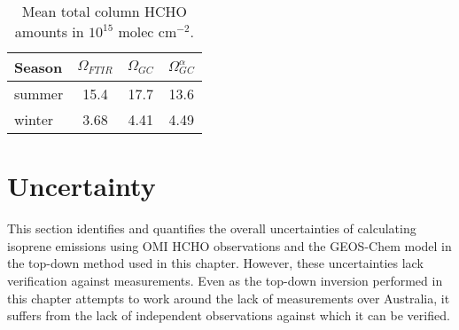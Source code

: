   
    \begin{table}\begin{threeparttable}
      \caption{Mean total column HCHO amounts in $10^{15}$ molec cm$^{-2}$.}
      \begin{tabular}{ l | c c c } 
        \toprule
        Season & $\Omega_{FTIR}$ & $\Omega_{GC}$ &  $\Omega_{GC}^{\alpha}$  \\
        \midrule
        summer & 15.4 & 17.7 & 13.6 \\
        winter & 3.68 & 4.41 & 4.49 \\
        \bottomrule
      \end{tabular}
      \label{BioIsop:results:measurements:tab_uncertainties}
    \end{threeparttable}\end{table}
  
  
  
    
\section{Uncertainty}
\label{BioIsop:uncertainty}
  
  
  This section identifies and quantifies the overall uncertainties of calculating isoprene emissions using OMI HCHO observations and the GEOS-Chem model in the top-down method used in this chapter.
  However, these uncertainties lack verification against measurements.
  Even as the top-down inversion performed in this chapter attempts to work around the lack of measurements over Australia, it suffers from the lack of independent observations against which it can be verified.
  
